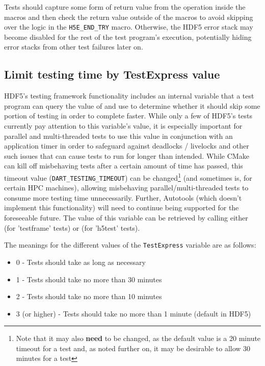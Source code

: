 \documentclass[../HDF5_RFC.tex]{subfiles}
\begin{document}
Tests should capture some form of return value from the operation inside the macros and then check the
return value outside of the macros to avoid skipping over the logic in the \texttt{H5E\_END\_TRY} macro.
Otherwise, the HDF5 error stack may become disabled for the rest of the test program's execution,
potentially hiding error stacks from other test failures later on.

\subsection{Limit testing time by TestExpress value}

HDF5's testing framework functionality includes an internal variable that a test program can query the
value of and use to determine whether it should skip some portion of testing in order to complete faster. While only a few of HDF5's tests currently pay attention to this variable's value, it is especially
important for parallel and multi-threaded tests to use this value in conjunction with an application
timer in order to safeguard against deadlocks / livelocks and other such issues that can cause tests
to run for longer than intended. While CMake can kill off misbehaving tests after a certain amount of
time has passed, this timeout value (\texttt{DART\_TESTING\_TIMEOUT}) can be changed\footnote{Note that
it may also \textbf{need} to be changed, as the default value is a 20 minute timeout for a test and, as
noted further on, it may be desirable to allow 30 minutes for a test} (and sometimes is, for certain HPC machines), allowing misbehaving parallel/multi-threaded tests to consume more testing time unnecessarily. Further, Autotools (which doesn't implement this functionality) will need to continue being supported for
the foreseeable future. The value of this variable can be retrieved by calling either
 (for 'testframe' tests) or 
(for 'h5test' tests).

The meanings for the different values of the \texttt{TestExpress} variable are as follows:

\begin{itemize}

    \item 0 - Tests should take as long as necessary
    \item 1 - Tests should take no more than 30 minutes
    \item 2 - Tests should take no more than 10 minutes
    \item 3 (or higher) - Tests should take no more than 1 minute (default in HDF5)

\end{itemize}
\end{document}
